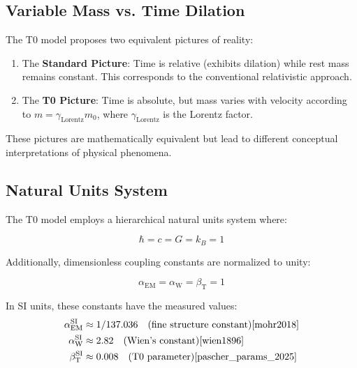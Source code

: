 \documentclass[12pt,a4paper]{article}
\newcommand{\alphaEM}{\alpha_{\text{EM}}}
\newcommand{\alphaW}{\alpha_{\text{W}}}
\newcommand{\betaT}{\beta_{\text{T}}}
\newcommand{\gammaf}{\gamma_{\text{Lorentz}}}
\begin{document}
	\subsection{Variable Mass vs. Time Dilation}
	\label{subsec:variable_mass}
	
	The T0 model proposes two equivalent pictures of reality\cite{pascher_zeit_2025}:
	
	\begin{enumerate}
		\item The \textbf{Standard Picture}: Time is relative (exhibits dilation) while rest mass remains constant. This corresponds to the conventional relativistic approach\cite{einstein1905}.
		\item The \textbf{T0 Picture}: Time is absolute, but mass varies with velocity according to $m = \gammaf m_0$, where $\gammaf$ is the Lorentz factor.
	\end{enumerate}
	
	These pictures are mathematically equivalent but lead to different conceptual interpretations of physical phenomena.
	
	\subsection{Natural Units System}
	\label{subsec:natural_units}
	
	The T0 model employs a hierarchical natural units system\cite{pascher_alphabeta_2025} where:
	
	\begin{equation}
		\label{eq:natural_units}
		\hbar = c = G = k_B = 1
	\end{equation}
	
	Additionally, dimensionless coupling constants are normalized to unity:
	
	\begin{equation}
		\label{eq:dimensionless_constants}
		\alphaEM = \alphaW = \betaT = 1
	\end{equation}
	
	In SI units, these constants have the measured values:
	\begin{align}
		\alphaEM^{\text{SI}} &\approx 1/137.036 \quad \text{(fine structure constant)}\cite{mohr2018} \\
		\alphaW^{\text{SI}} &\approx 2.82 \quad \text{(Wien's constant)}\cite{wien1896} \\
		\betaT^{\text{SI}} &\approx 0.008 \quad \text{(T0 parameter)}\cite{pascher_params_2025}
	\end{align}
	
\end{document}
